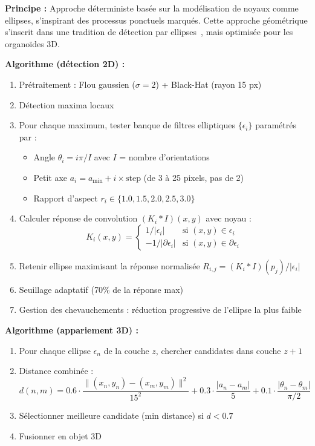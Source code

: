 \textbf{Principe :}
Approche déterministe basée sur la modélisation de noyaux comme ellipses, s'inspirant des processus ponctuels marqués. Cette approche géométrique s'inscrit dans une tradition de détection par ellipses~\cite{Kirsten2023}, mais optimisée pour les organoïdes 3D.

\textbf{Algorithme (détection 2D) :}
\begin{enumerate}
    \item Prétraitement : Flou gaussien ($\sigma=2$) + Black-Hat (rayon 15 px)
    \item Détection maxima locaux
    \item Pour chaque maximum, tester banque de filtres elliptiques $\{\epsilon_i\}$ paramétrés par :
        \begin{itemize}
            \item Angle $\theta_i = i\pi / I$ avec $I$ = nombre d'orientations
            \item Petit axe $a_i = a_{\min} + i \times \text{step}$ (de 3 à 25 pixels, pas de 2)
            \item Rapport d'aspect $r_i \in \{1.0, 1.5, 2.0, 2.5, 3.0\}$
        \end{itemize}
    \item Calculer réponse de convolution $(K_i * I)(x, y)$ avec noyau :
        \[
        K_i(x, y) = \begin{cases}
            1/|\epsilon_i| & \text{si } (x, y) \in \epsilon_i \\
            -1/|\partial \epsilon_i| & \text{si } (x, y) \in \partial \epsilon_i
        \end{cases}
        \]
    \item Retenir ellipse maximisant la réponse normalisée $R_{i,j} = (K_i * I)(p_j) / |\epsilon_i|$
    \item Seuillage adaptatif (70\% de la réponse max)
    \item Gestion des chevauchements : réduction progressive de l'ellipse la plus faible
\end{enumerate}

\textbf{Algorithme (appariement 3D) :}
\begin{enumerate}
    \item Pour chaque ellipse $\epsilon_n$ de la couche $z$, chercher candidates dans couche $z+1$
    \item Distance combinée :
        \[
        d(n, m) = 0.6 \cdot \frac{\|(x_n, y_n) - (x_m, y_m)\|^2}{15^2} + 0.3 \cdot \frac{|a_n - a_m|}{5} + 0.1 \cdot \frac{|\theta_n - \theta_m|}{\pi/2}
        \]
    \item Sélectionner meilleure candidate (min distance) si $d < 0.7$
    \item Fusionner en objet 3D
\end{enumerate}

